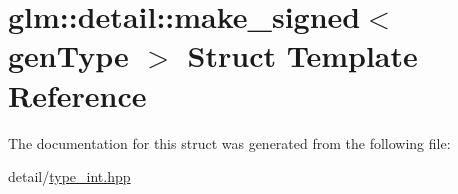 \hypertarget{structglm_1_1detail_1_1make__signed}{\section{glm\-:\-:detail\-:\-:make\-\_\-signed$<$ gen\-Type $>$ Struct Template Reference}
\label{structglm_1_1detail_1_1make__signed}
}


The documentation for this struct was generated from the following file\-:\begin{DoxyCompactItemize}
\item 
detail/\hyperlink{type__int_8hpp}{type\-\_\-int.\-hpp}\end{DoxyCompactItemize}
